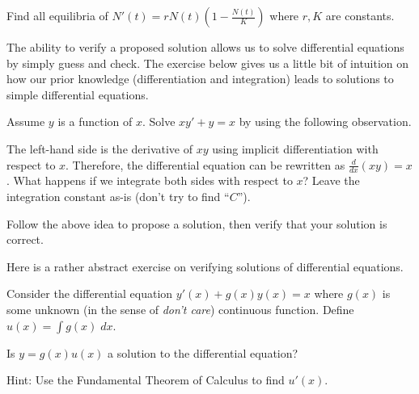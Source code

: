 \documentclass[../main.tex]{subfiles}
\begin{document}
\begin{example}
  Find all equilibria of \(N'(t) = r N(t) \left(1 - \frac{N(t)}{K}\right)\) where \(r,K\) are constants.

\end{example}
\clearpage

The ability to verify a proposed solution allows us to solve differential equations by simply guess and check. The exercise below gives us a little bit of intuition on how our prior knowledge (differentiation and integration) leads to solutions to simple differential equations.
\begin{example}
  Assume \(y\) is a function of \(x\). Solve \(xy' + y = x\) by using the following observation.

  The left-hand side is the derivative of \(xy\) using implicit differentiation with respect to \(x\). Therefore, the differential equation can be rewritten as \(\frac{d}{dx} \left( xy \right) = x\). What happens if we integrate both sides with respect to \(x\)?  Leave the integration constant as-is (don't try to find ``\(C\)'').

  Follow the above idea to propose a solution, then verify that your solution is correct. 

\end{example}
\clearpage

Here is a rather abstract exercise on verifying solutions of differential equations.

\begin{example}
  Consider the differential equation \(y'(x) + g(x) y(x) = x\) where \(g(x)\) is some unknown (in the sense of \emph{don't care}) continuous function. Define \(u(x) = \int g(x) \;dx\). 

  Is \(y = g(x)u(x)\) a solution to the differential equation? 

  Hint: Use the Fundamental Theorem of Calculus to find \(u'(x)\).

\end{example}
\clearpage

\end{document}
